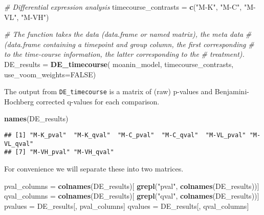 \documentclass[9pt,a4paper,]{extarticle}
\newenvironment{Shaded}{\begin{snugshade}}{\end{snugshade}}
\newcommand{\CommentTok}[1]{\textcolor[rgb]{0.56,0.35,0.01}{\textit{#1}}}
\newcommand{\DataTypeTok}[1]{\textcolor[rgb]{0.13,0.29,0.53}{#1}}
\newcommand{\KeywordTok}[1]{\textcolor[rgb]{0.13,0.29,0.53}{\textbf{#1}}}
\newcommand{\NormalTok}[1]{#1}
\newcommand{\OtherTok}[1]{\textcolor[rgb]{0.56,0.35,0.01}{#1}}
\newcommand{\StringTok}[1]{\textcolor[rgb]{0.31,0.60,0.02}{#1}}
\begin{document}
\begin{Shaded}
\begin{Highlighting}[]
\CommentTok{# Differential expression analysis}
\NormalTok{timecourse_contrasts =}\StringTok{ }\KeywordTok{c}\NormalTok{(}\StringTok{"M-K"}\NormalTok{, }\StringTok{"M-C"}\NormalTok{, }\StringTok{"M-VL"}\NormalTok{, }\StringTok{"M-VH"}\NormalTok{)}

\CommentTok{# The function takes the data (data.frame or named matrix), the meta data}
\CommentTok{# (data.frame containing a timepoint and group column, the first corresponding}
\CommentTok{# to the time-course information, the latter corresponding to the}
\CommentTok{# treatment).}
\NormalTok{DE_results =}\StringTok{ }\KeywordTok{DE_timecourse}\NormalTok{( moanin_model, timecourse_contrasts,}
    \DataTypeTok{use_voom_weights=}\OtherTok{FALSE}\NormalTok{)}
\end{Highlighting}
\end{Shaded}

The output from \texttt{DE\_timecourse} is a matrix of (raw) p-values and Benjamini-Hochberg corrected q-values for each comparison.

\begin{Shaded}
\begin{Highlighting}[]
\KeywordTok{names}\NormalTok{(DE_results)}
\end{Highlighting}
\end{Shaded}

\begin{verbatim}
## [1] "M-K_pval"  "M-K_qval"  "M-C_pval"  "M-C_qval"  "M-VL_pval" "M-VL_qval"
## [7] "M-VH_pval" "M-VH_qval"
\end{verbatim}

For convenience we will separate these into two matrices.

\begin{Shaded}
\begin{Highlighting}[]
\NormalTok{pval_columns =}\StringTok{ }\KeywordTok{colnames}\NormalTok{(DE_results)[}
    \KeywordTok{grepl}\NormalTok{(}\StringTok{"pval"}\NormalTok{, }\KeywordTok{colnames}\NormalTok{(DE_results))]}
\NormalTok{qval_columns =}\StringTok{ }\KeywordTok{colnames}\NormalTok{(DE_results)[}
    \KeywordTok{grepl}\NormalTok{(}\StringTok{"qval"}\NormalTok{, }\KeywordTok{colnames}\NormalTok{(DE_results))]}
\NormalTok{pvalues =}\StringTok{ }\NormalTok{DE_results[, pval_columns]}
\NormalTok{qvalues =}\StringTok{ }\NormalTok{DE_results[, qval_columns]}
\end{Highlighting}
\end{Shaded}
\end{document}
